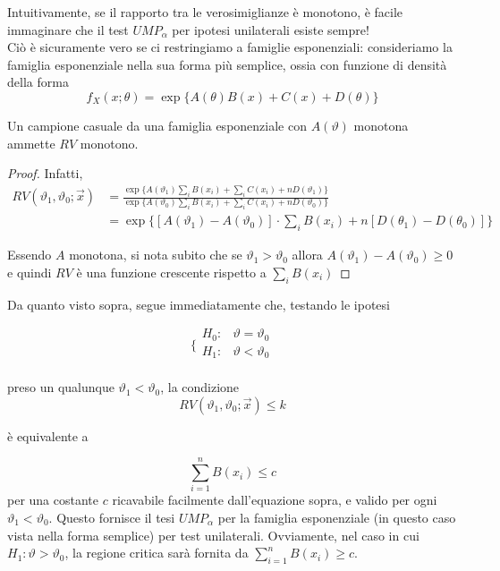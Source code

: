 Intuitivamente, se il rapporto tra le verosimiglianze è monotono, è facile immaginare che il test $UMP_\alpha$ per ipotesi unilaterali esiste sempre!
\\
Ciò è sicuramente vero se ci restringiamo a famiglie esponenziali:
consideriamo la famiglia esponenziale nella sua forma più semplice, ossia con funzione di densità della forma
$$f_X(x;\theta) = \exp \{ A(\theta) B (x) +  C(x) +  D(\theta) \}$$

\begin{lemma}
Un campione casuale da una famiglia esponenziale con $A(\vartheta)$ monotona ammette $RV$ monotono.
\end{lemma}

\begin{proof}
Infatti, 
\begin{align*}
RV(\vartheta_1,\vartheta_0; \vec{x}) 
&= \frac{\exp \{ A(\vartheta_1) \sum_i B (x_i) + \sum_i C(x_i) +  n D(\vartheta_1) \}}{\exp \{  A(\vartheta_0) \sum_i B (x_i) +  \sum_i C(x_i) +  n D(\vartheta_0) \}}
\\&= \exp \{ [A(\vartheta_1) - A(\vartheta_0)] \cdot \sum_i B(x_i) + n[ D(\theta_1) -  D(\theta_0)] \}
\end{align*}

Essendo $A$ monotona, si nota subito che se $\vartheta_1 > \vartheta_0$ allora $A(\vartheta_1) - A(\vartheta_0)\geq 0$ e quindi $RV$ è una funzione crescente rispetto a $\sum_i B (x_i)$
\end{proof}

Da quanto visto sopra, segue immediatamente che, testando le ipotesi 

$$\bigg \{
\begin{array}{rl}
H_0: & \vartheta = \vartheta_0 \\
H_1: & \vartheta < \vartheta_0 \\
\end{array}
$$

preso un qualunque $\vartheta_1 < \vartheta_0$, la condizione 
$$RV(\vartheta_1,\vartheta_0;\vec{x}) \leq k$$

è equivalente a 

$$\sum_{i=1}^n B(x_i) \leq c$$ per una costante $c$ ricavabile facilmente dall'equazione sopra, e valido per ogni $\vartheta_1 < \vartheta_0$. Questo fornisce il tesi $UMP_\alpha$
per la famiglia esponenziale (in questo caso vista nella forma semplice) per test unilaterali. Ovviamente, nel caso in cui $H_1: \vartheta > \vartheta_0$, la regione critica sarà fornita da $\sum_{i=1}^n B(x_i) \geq c$.\\

